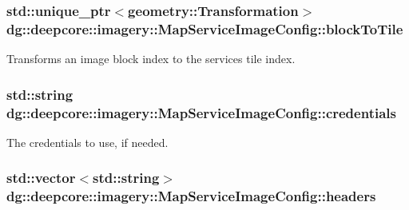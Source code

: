 \subsubsection[{\texorpdfstring{block\+To\+Tile}{blockToTile}}]{\setlength{\rightskip}{0pt plus 5cm}std\+::unique\+\_\+ptr$<${\bf geometry\+::\+Transformation}$>$ dg\+::deepcore\+::imagery\+::\+Map\+Service\+Image\+Config\+::block\+To\+Tile}\hypertarget{structdg_1_1deepcore_1_1imagery_1_1_map_service_image_config_a629792227fe086761b4dc6c608bdef28}{}\label{structdg_1_1deepcore_1_1imagery_1_1_map_service_image_config_a629792227fe086761b4dc6c608bdef28}


Transforms an image block index to the service\textquotesingle{}s tile index. 

\subsubsection[{\texorpdfstring{credentials}{credentials}}]{\setlength{\rightskip}{0pt plus 5cm}std\+::string dg\+::deepcore\+::imagery\+::\+Map\+Service\+Image\+Config\+::credentials}\hypertarget{structdg_1_1deepcore_1_1imagery_1_1_map_service_image_config_a6ca48897a8aa2f53e481777ca4d61ebf}{}\label{structdg_1_1deepcore_1_1imagery_1_1_map_service_image_config_a6ca48897a8aa2f53e481777ca4d61ebf}


The credentials to use, if needed. 

\subsubsection[{\texorpdfstring{headers}{headers}}]{\setlength{\rightskip}{0pt plus 5cm}std\+::vector$<$std\+::string$>$ dg\+::deepcore\+::imagery\+::\+Map\+Service\+Image\+Config\+::headers}\hypertarget{structdg_1_1deepcore_1_1imagery_1_1_map_service_image_config_aa9694b5df7ea2e7fd581a88ddb76be8d}{}\label{structdg_1_1deepcore_1_1imagery_1_1_map_service_image_config_aa9694b5df7ea2e7fd581a88ddb76be8d}


